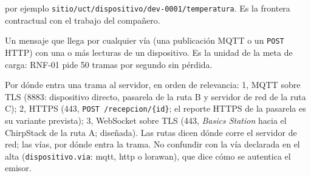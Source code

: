 \begin{description}
por ejemplo \texttt{sitio/uct/dispositivo/dev-0001/temperatura}. Es la frontera contractual con el
trabajo del compañero.
\item[Trama] Un mensaje que llega por cualquier vía (una publicación MQTT o un \texttt{POST} HTTP) con una o más
lecturas de un dispositivo. Es la unidad de la meta de carga: RNF-01 pide 50 tramas por segundo sin pérdida.
\item[Vías 1 a 3] Por dónde entra una trama al servidor, en orden de relevancia: 1, MQTT sobre TLS (8883: dispositivo directo, pasarela
de la ruta B y servidor de red de la ruta C); 2, HTTPS (443, \texttt{POST /recepcion/\{id\}}; el reporte HTTPS de la pasarela es su
variante prevista); 3, WebSocket sobre TLS (443, \emph{Basics Station} hacia el ChirpStack de la ruta A; diseñada). Las rutas dicen
dónde corre el servidor de red; las vías, por dónde entra la trama. No confundir con la vía declarada en el alta
(\texttt{dispositivo.via}: mqtt, http o lorawan), que dice cómo se autentica el emisor.
\end{description}
